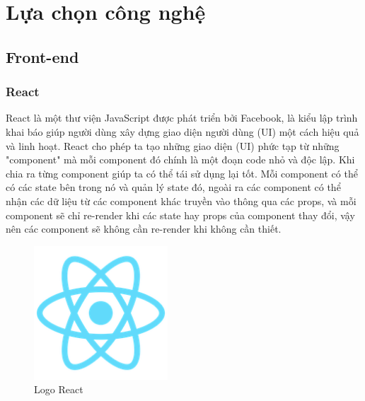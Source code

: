 \section{Lựa chọn công nghệ}

    \subsection{Front-end}
        \subsubsection{React}
            \hspace*{0.5cm} React là một thư viện JavaScript được phát triển bởi Facebook, là kiểu lập trình khai báo giúp người dùng xây dựng giao diện người dùng (UI) một cách hiệu quả và linh hoạt. React cho phép ta tạo những giao diện (UI) phức tạp từ những "component" mà mỗi component đó chính là một đoạn code nhỏ và độc lập. Khi chia ra từng component giúp ta có thể tái sử dụng lại tốt. Mỗi component có thể có các state bên trong nó và quản lý state đó, ngoài ra các component có thể nhận các dữ liệu từ các component khác truyền vào thông qua các props, và mỗi component sẽ chỉ re-render khi các state hay props của component thay đổi, vậy nên các component sẽ không cần re-render khi không cần thiết.\\
            
            \begin{figure}[!htp]
                \begin{center}
                \includegraphics[width=5cm]{img/Technology/react.png}
                \end{center}
                \caption{Logo React \cite{technologyReact}}
            \end{figure}

